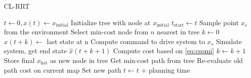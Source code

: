 \begin{algorithm} [t]
\caption{CL-RRT}
\label{alg:clrrt}
\begin{algorithmic}[1]
\State $t \gets 0, x(t) \gets x_\text{initial}$
\State Initialize tree with node at $x_\text{initial}$
\State $t_\text{start} \gets t$
\State Sample point $x_s$ from the environment
\State Select min-cost node from $n$ nearest in tree
\State $k \gets 0$
\State $\hat{x}(t+k) \gets $ last state at n
	\State Compute command to drive system to $x_s$
	\State Simulate system, get end state $\hat{x}(t+k+1)$
	\State Compute cost based on \eqref{eq:csqmi}
	\State $k \gets k+1$
\EndWhile
\State Store final $x_\text{hat}$ as new node in tree
\EndFor
\State Get min-cost path from tree
\State Re-evaluate old path cost on current map
\State Set new path
\EndIf
\State $t \gets t$ + planning time
\EndWhile
\end{algorithmic}
\end{algorithm}

